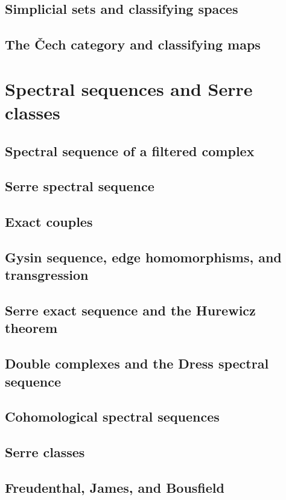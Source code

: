 \documentclass[oneside]{amsbook}
\numberwithin{ex}{section}
\begin{document}
\section{Simplicial sets and classifying spaces}

\section{The Čech category and classifying maps}


\chapter{Spectral sequences and Serre classes}
\setcounter{section}{60}
\section{Spectral sequence of a filtered complex}

\section{Serre spectral sequence}

\section{Exact couples}

\section{Gysin sequence, edge homomorphisms, and transgression}

\section{Serre exact sequence and the Hurewicz theorem}

\section{Double complexes and the Dress spectral sequence}

\section{Cohomological spectral sequences}

\section{Serre classes}

\setcounter{section}{69}
\section{Freudenthal, James, and Bousfield}

\end{document}
